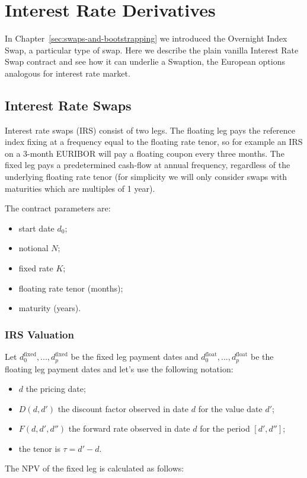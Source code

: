 \chapter{Interest Rate Derivatives}
\label{interest-rate-swaps-and-swaptions}

In Chapter~\ref{sec:swaps-and-bootstrapping} we introduced the Overnight Index Swap, a particular type of swap. Here we describe the plain vanilla Interest Rate Swap contract and see how it can underlie a Swaption, the European options analogous for interest rate market.

\section{Interest Rate Swaps}\label{interest-rate-swaps}

Interest rate swaps (IRS) consist of two legs. The floating leg pays the reference index fixing at a frequency equal to the floating rate tenor, so for example an IRS on a 3-month EURIBOR will pay a floating coupon every three months.
The fixed leg pays a predetermined cash-flow at annual frequency, regardless of the underlying floating rate tenor (for simplicity we will only consider swaps with maturities which are multiples of 1 year).

The contract parameters are:

\begin{itemize}
\tightlist
\item start date $d_0$;
\item notional $N$;
\item fixed rate $K$;
\item floating rate tenor (months);
\item maturity (years).
\end{itemize}

\subsection{IRS Valuation}
\label{irs-valuation}

Let $d_0^{\mathrm{fixed}},...,d_p^{\mathrm{fixed}}$ be the fixed leg payment dates and $d_0^{\mathrm{float}},...,d_p^{\mathrm{float}}$ be the floating leg payment dates and let's use the following notation:

\begin{itemize}
\tightlist
\item $d$ the pricing date;
\item $D(d, d')$ the discount factor observed in date $d$ for the value date $d'$;
\item $F(d, d', d'')$ the forward rate observed in date $d$ for the period $[d', d'']$;
\item the tenor is $\tau = d' - d$.
\end{itemize}
The NPV of the fixed leg is calculated as follows:

